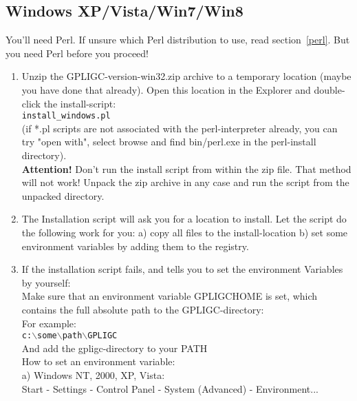 \subsection{Windows XP/Vista/Win7/Win8}
\label{windows_install}


You'll need Perl. If unsure which Perl distribution to use, read section~\ref{perl}. But you need Perl before you proceed!

\begin{enumerate}

\item Unzip the GPLIGC-version-win32.zip archive to a temporary location
(maybe you have done that already).
Open this location in the Explorer and double-click the install-script: \\
\texttt{install\_windows.pl} \\
(if *.pl scripts are not associated with the perl-interpreter already,
you can try "open with", select browse and find bin/perl.exe in the
perl-install directory). \\
\textbf{Attention!} Don't run the install script from within the zip file. That method will not work!
Unpack the zip archive in any case and run the script from the unpacked directory.

\item The Installation script will ask you for a location to install.
Let the script do the following work for you:
a) copy all files to the install-location
b) set some environment variables by adding them to the registry.


\item If the installation script fails, and tells you to set the environment Variables
by yourself:\\
Make sure that an environment variable GPLIGCHOME is set,
which contains the full absolute path to the GPLIGC-directory:\\
For example: \\
\texttt{c:$\backslash$some$\backslash$path$\backslash$GPLIGC} \\
And add the gpligc-directory to your PATH \\
How to set an environment variable: \\
a) Windows NT, 2000, XP, Vista: \\
Start - Settings - Control Panel - System (Advanced) - Environment... \\


\end{enumerate}
